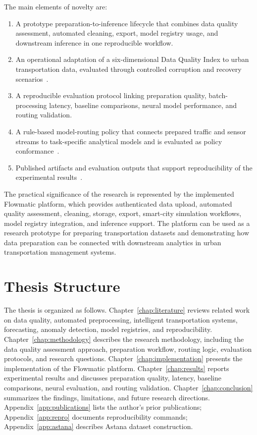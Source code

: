 The main elements of novelty are:
\begin{enumerate}
  \item A prototype preparation-to-inference lifecycle that combines data quality assessment, automated cleaning, export, model registry usage, and downstream inference in one reproducible workflow.
  \item An operational adaptation of a six-dimensional Data Quality Index to urban transportation data, evaluated through controlled corruption and recovery scenarios~\cite{yedilkhan2025flowmatic}.
  \item A reproducible evaluation protocol linking preparation quality, batch-processing latency, baseline comparisons, neural model performance, and routing validation.
  \item A rule-based model-routing policy that connects prepared traffic and sensor streams to task-specific analytical models and is evaluated as policy conformance~\cite{bakytuly2026microservices}.
  \item Published artifacts and evaluation outputs that support reproducibility of the experimental results~\cite{kreutzberger2022mlops,wolf2020transformers}.
\end{enumerate}

The practical significance of the research is represented by the implemented Flowmatic platform, which provides authenticated data upload, automated quality assessment, cleaning, storage, export, smart-city simulation workflows, model registry integration, and inference support. The platform can be used as a research prototype for preparing transportation datasets and demonstrating how data preparation can be connected with downstream analytics in urban transportation management systems.

\section{Thesis Structure}

The thesis is organized as follows. Chapter~\ref{chap:literature} reviews related work on data quality, automated preprocessing, intelligent transportation systems, forecasting, anomaly detection, model registries, and reproducibility. Chapter~\ref{chap:methodology} describes the research methodology, including the data quality assessment approach, preparation workflow, routing logic, evaluation protocols, and research questions. Chapter~\ref{chap:implementation} presents the implementation of the Flowmatic platform. Chapter~\ref{chap:results} reports experimental results and discusses preparation quality, latency, baseline comparisons, neural evaluation, and routing validation. Chapter~\ref{chap:conclusion} summarizes the findings, limitations, and future research directions. Appendix~\ref{app:publications} lists the author's prior publications; Appendix~\ref{app:repro} documents reproducibility commands; Appendix~\ref{app:astana} describes Astana dataset construction.

